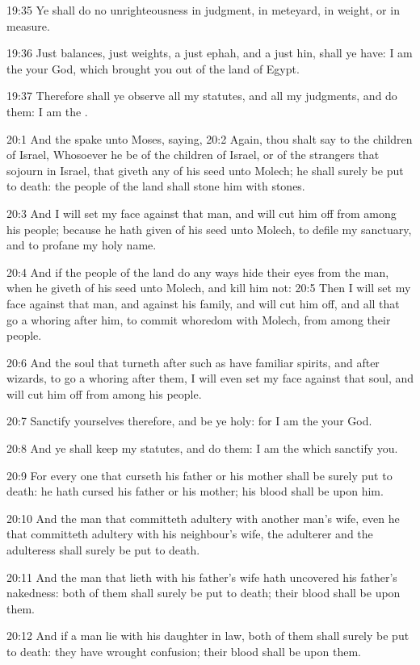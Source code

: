 19:35 Ye shall do no unrighteousness in judgment, in meteyard, in weight, or in measure.

19:36 Just balances, just weights, a just ephah, and a just hin, shall ye have: I am the \LORD your God, which brought you out of the land of Egypt.

19:37 Therefore shall ye observe all my statutes, and all my judgments, and do them: I am the \LORD.

20:1 And the \LORD spake unto Moses, saying, 20:2 Again, thou shalt say to the children of Israel, Whosoever he be of the children of Israel, or of the strangers that sojourn in Israel, that giveth any of his seed unto Molech; he shall surely be put to death: the people of the land shall stone him with stones.

20:3 And I will set my face against that man, and will cut him off from among his people; because he hath given of his seed unto Molech, to defile my sanctuary, and to profane my holy name.

20:4 And if the people of the land do any ways hide their eyes from the man, when he giveth of his seed unto Molech, and kill him not: 20:5 Then I will set my face against that man, and against his family, and will cut him off, and all that go a whoring after him, to commit whoredom with Molech, from among their people.

20:6 And the soul that turneth after such as have familiar spirits, and after wizards, to go a whoring after them, I will even set my face against that soul, and will cut him off from among his people.

20:7 Sanctify yourselves therefore, and be ye holy: for I am the \LORD your God.

20:8 And ye shall keep my statutes, and do them: I am the \LORD which sanctify you.

20:9 For every one that curseth his father or his mother shall be surely put to death: he hath cursed his father or his mother; his blood shall be upon him.

20:10 And the man that committeth adultery with another man's wife, even he that committeth adultery with his neighbour's wife, the adulterer and the adulteress shall surely be put to death.

20:11 And the man that lieth with his father's wife hath uncovered his father's nakedness: both of them shall surely be put to death; their blood shall be upon them.

20:12 And if a man lie with his daughter in law, both of them shall surely be put to death: they have wrought confusion; their blood shall be upon them.

